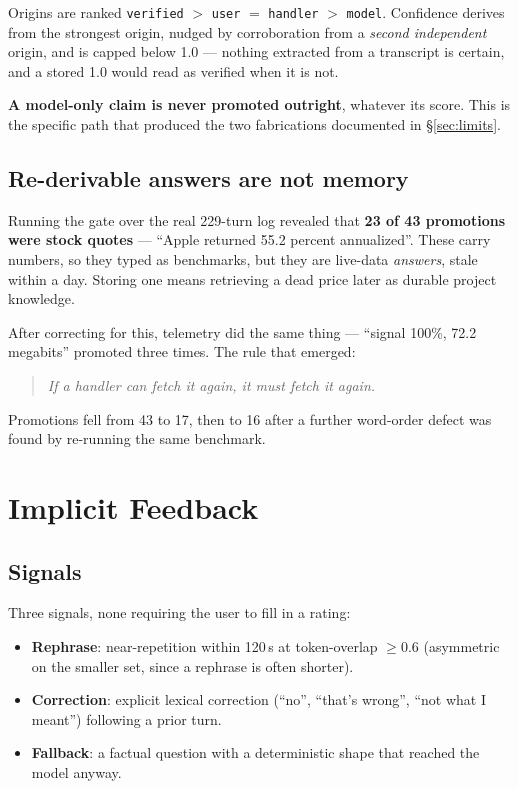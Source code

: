 \documentclass[10pt,twocolumn]{article}
\newcommand{\code}[1]{\texttt{\small #1}}
\begin{document}
Origins are ranked \code{verified} $>$ \code{user} $=$ \code{handler} $>$ \code{model}.
Confidence derives from the strongest origin, nudged by corroboration from a
\emph{second independent} origin, and is capped below 1.0 --- nothing extracted from a
transcript is certain, and a stored 1.0 would read as verified when it is not.

\textbf{A model-only claim is never promoted outright}, whatever its score. This is the
specific path that produced the two fabrications documented in \S\ref{sec:limits}.

\subsection{Re-derivable answers are not memory}

Running the gate over the real 229-turn log revealed that \textbf{23 of 43 promotions
were stock quotes} --- ``Apple returned 55.2 percent annualized''. These carry numbers, so
they typed as benchmarks, but they are live-data \emph{answers}, stale within a day.
Storing one means retrieving a dead price later as durable project knowledge.

After correcting for this, telemetry did the same thing --- ``signal 100\%, 72.2
megabits'' promoted three times. The rule that emerged:

\begin{quote}\itshape
If a handler can fetch it again, it must fetch it again.
\end{quote}

Promotions fell from 43 to 17, then to 16 after a further word-order defect was found by
re-running the same benchmark.

\section{Implicit Feedback}
\label{sec:feedback}

\subsection{Signals}

Three signals, none requiring the user to fill in a rating:

\begin{itemize}\itemsep1pt
\item \textbf{Rephrase}: near-repetition within 120\,s at token-overlap $\geq 0.6$
(asymmetric on the smaller set, since a rephrase is often shorter).
\item \textbf{Correction}: explicit lexical correction (``no'', ``that's wrong'',
``not what I meant'') following a prior turn.
\item \textbf{Fallback}: a factual question with a deterministic shape that reached
the model anyway.
\end{itemize}
\end{document}
